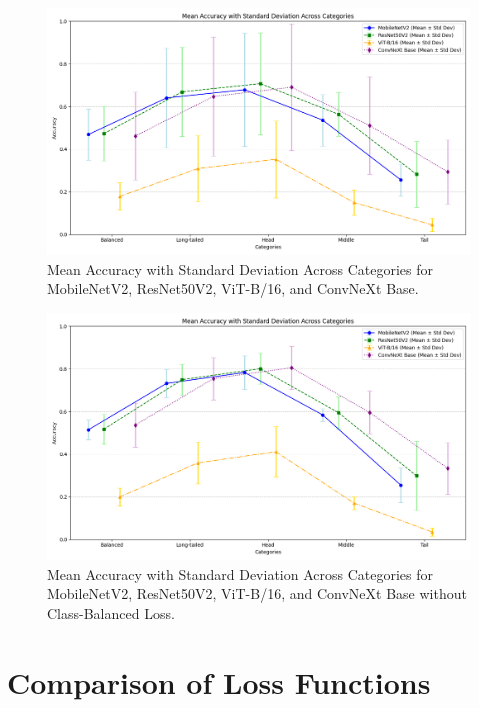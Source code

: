 \begin{figure}[h!]
    \centering
    \includegraphics[width=\textwidth]{Images/Plots/mean_loss_comparison.png}
    \caption{Mean Accuracy with Standard Deviation Across Categories for MobileNetV2, ResNet50V2, ViT-B/16, and ConvNeXt Base.}
    \label{fig:mean_loss_comparison_line}
\end{figure}

\begin{figure}[h!]
    \centering
    \includegraphics[width=\textwidth]{Images/Plots/mean_loss_comparison_noCB.png}
    \caption{Mean Accuracy with Standard Deviation Across Categories for MobileNetV2, ResNet50V2, ViT-B/16, and ConvNeXt Base without Class-Balanced Loss.}
    \label{fig:mean_loss_comparison_line_noCB}
\end{figure}



\section{Comparison of Loss Functions}


